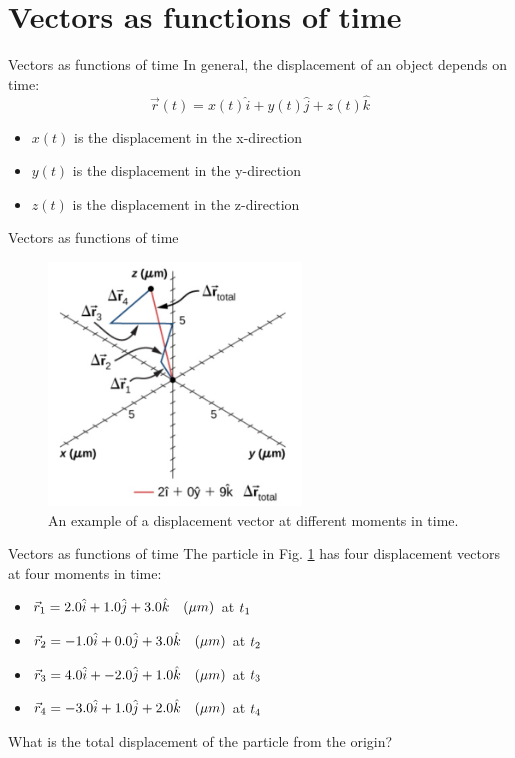 \documentclass{beamer}
\begin{document}
\section{Vectors as functions of time}

\begin{frame}{Vectors as functions of time}
In general, the displacement of an object depends on time:
\begin{equation}
\vec{r}(t) = x(t) \hat{i} + y(t) \hat{j} + z(t) \hat{k}
\end{equation}
\begin{itemize}
\item $x(t)$ is the displacement in the x-direction
\item $y(t)$ is the displacement in the y-direction
\item $z(t)$ is the displacement in the z-direction
\end{itemize}
\end{frame}

\begin{frame}{Vectors as functions of time}
\begin{figure}
\centering
\includegraphics[width=0.6\textwidth,trim=0cm 2cm 0cm 0cm,clip=true]{figures/Brownian.png}
\caption{\label{fig:brown} An example of a displacement vector at different moments in time.}
\end{figure}
\end{frame}

\begin{frame}{Vectors as functions of time}
The particle in Fig. \ref{fig:brown} has four displacement vectors at four moments in time:
\begin{itemize}
\item $\vec{r}_{\rm 1} = 2.0\hat{i} + 1.0\hat{j} + 3.0\hat{k}\quad(\mu m)$ at $t_{\rm 1}$
\item $\vec{r}_{\rm 2} = -1.0\hat{i} + 0.0\hat{j} + 3.0\hat{k}\quad(\mu m)$ at $t_{\rm 2}$
\item $\vec{r}_{\rm 3} = 4.0\hat{i} + -2.0\hat{j} + 1.0\hat{k}\quad(\mu m)$ at $t_{\rm 3}$
\item $\vec{r}_{\rm 4} = -3.0\hat{i} + 1.0\hat{j} + 2.0\hat{k}\quad(\mu m)$ at $t_{\rm 4}$
\end{itemize}
What is the total displacement of the particle from the origin?
\end{frame}
\end{document}
